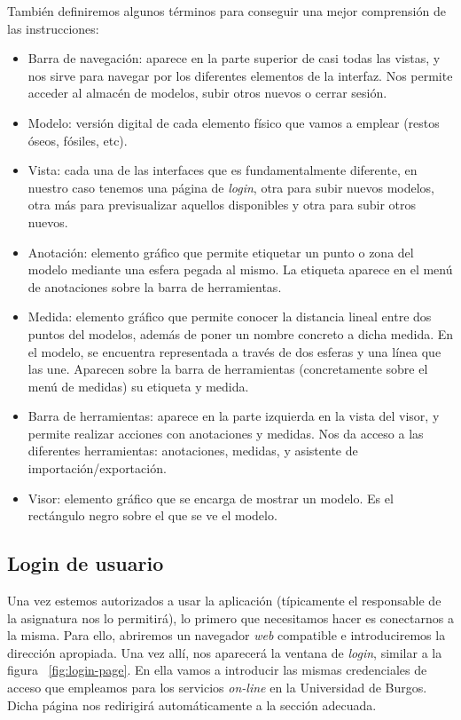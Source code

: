 También definiremos algunos términos para conseguir una mejor comprensión de las instrucciones:
\begin{itemize}
	\item Barra de navegación: aparece en la parte superior de casi todas las vistas, y nos sirve para navegar por los diferentes elementos de la interfaz. Nos permite acceder al almacén de modelos, subir otros nuevos o cerrar sesión.
	\item Modelo: versión digital de cada elemento físico que vamos a emplear (restos óseos, fósiles, etc).
	\item Vista: cada una de las interfaces que es fundamentalmente diferente, en nuestro caso tenemos una página de \textit{login}, otra para subir nuevos modelos, otra más para previsualizar aquellos disponibles y otra para subir otros nuevos.
	\item Anotación: elemento gráfico que permite etiquetar un punto o zona del modelo mediante una esfera pegada al mismo. La etiqueta aparece en el menú de anotaciones sobre la barra de herramientas.
	\item Medida: elemento gráfico que permite conocer la distancia lineal entre dos puntos del modelos, además de poner un nombre concreto a dicha medida. En el modelo, se encuentra representada a través de dos esferas y una línea que las une. Aparecen sobre la barra de herramientas (concretamente sobre el menú de medidas) su etiqueta y medida.
	\item Barra de herramientas: aparece en la parte izquierda en la vista del visor, y permite realizar acciones con anotaciones y medidas. Nos da acceso a las diferentes herramientas: anotaciones, medidas, y asistente de importación\slash exportación.
	\item Visor: elemento gráfico que se encarga de mostrar un modelo. Es el rectángulo negro sobre el que se ve el modelo.
\end{itemize}

\subsection{Login de usuario}
Una vez estemos autorizados a usar la aplicación (típicamente el responsable de la asignatura nos lo permitirá), lo primero que necesitamos hacer es conectarnos a la misma. Para ello, abriremos un navegador \textit{web} compatible e introduciremos la dirección apropiada. Una vez allí, nos aparecerá la ventana de \textit{login}, similar a la figura ~\ref{fig:login-page}. En ella vamos a introducir las mismas credenciales de acceso que empleamos para los servicios \textit{on-line} en la Universidad de Burgos. Dicha página nos redirigirá automáticamente a la sección adecuada.

